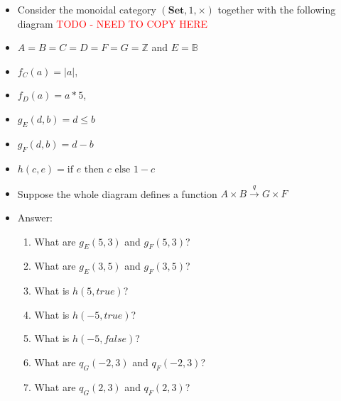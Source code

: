 
\begin{itemize}

    \item Consider the monoidal category $(\mathbf{Set},1,\times)$ together with the following diagram \textcolor{red}{TODO - NEED TO COPY HERE}
    \item $A=B=C=D=F=G=\mathbb{Z}$ and $E=\mathbb{B}$
    \item $f_C(a)=|a|$,
    \item $f_D(a)=a*5$,
    \item $g_E(d,b)=d\leq b$
    \item $g_F(d,b)=d-b$
    \item $h(c,e)=\text{if }e\text{ then }c\text{ else }1-c$
    \item Suppose the whole diagram defines a function $A \times B \xrightarrow{q} G \times F$
    \item Answer:
          \begin{enumerate}
            \item What are $g_E(5,3)$ and $g_F(5,3)$?
            \item What are $g_E(3,5)$ and $g_F(3,5)$?
            \item What is $h(5,true)$?
            \item What is $h(-5,true)$?
            \item What is $h(-5,false)$?
            \item What are $q_G(-2,3)$ and $q_F(-2,3)$?
            \item What are $q_G(2,3)$ and $q_F(2,3)$?
          \end{enumerate}
  \end{itemize}